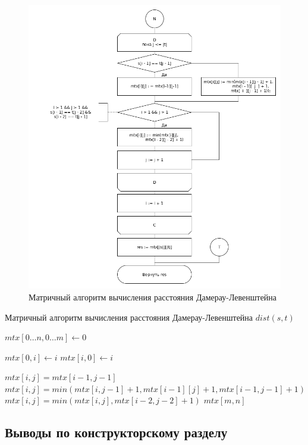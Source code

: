 \documentclass[a4paper,12pt]{article}
\begin{document}
		 		\begin{figure}[h]
		 			\centering
		 			{
		 				\includegraphics[scale=0.51]{dlm2.png}
		 				\caption{Матричный алгоритм вычисления расстояния Дамерау-Левенштейна}
		 				\label{ris:matr_dl_sh2}
		 			}
		 		\end{figure}
	
	\begin{algorithm}
		\caption{Матричный алгоритм вычисления расстояния Дамерау-Левенштейна $dist(s, t)$}
		\begin{algorithmic}
			\State $mtx [0 \dots n, 0 \dots m] \gets 0$
			
				\State $mtx[0, i] \gets i$
			\EndFor
				\State $mtx[i, 0] \gets i$
			\EndFor
			
			\State
			
						\State $mtx[i, j] = mtx[i-1, j-1]$
					\Else
						\State $mtx[i, j] = min(mtx[i,j-1]+1, 
												mtx[i-1][j]+1,
												mtx[i-1,j-1]+1)$
					\EndIf
						\State $mtx[i,j] = min(mtx[i,j], mtx[i-2,j-2]+1)$
					\EndIf 
				\EndFor
			\EndFor
			\State \Return $mtx[m, n]$
				
		\end{algorithmic}
	\end{algorithm}
    \newpage
    \afterpage{\FloatBarrier}
    \begin{center}
    	\subsection{Выводы по конструкторскому разделу}    
    \end{center}
   
\end{document}

